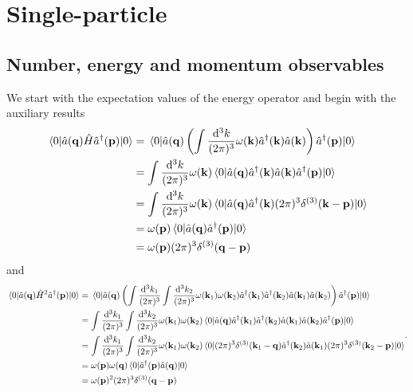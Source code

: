 \section{Single-particle}

\subsection{Number, energy and momentum observables}

We start with the expectation values of the energy operator and begin with the auxiliary results
\begin{equation}
	\begin{split}
		\expval{\hat{a}(\vb{q})\hat{H}\hat{a}^\dagger(\vb{p})}{0}
		&=
		\expval{
			\hat{a}(\vb{q})
			\left(
				\int\frac{\dd[3]{k}}{(2\pi)^3}
				\omega(\vb{k})
				\hat{a}^\dagger(\vb{k})
				\hat{a}(\vb{k})
			\right)
			\hat{a}^\dagger(\vb{p})
		}{0}
		\\
		&=
		\int\frac{\dd[3]{k}}{(2\pi)^3}
		\omega(\vb{k})
		\expval{
			\hat{a}(\vb{q})
			\hat{a}^\dagger(\vb{k})
			\hat{a}(\vb{k})
			\hat{a}^\dagger(\vb{p})
		}{0}
		\\
		&=
		\int\frac{\dd[3]{k}}{(2\pi)^3}
		\omega(\vb{k})
		\expval{
			\hat{a}(\vb{q})
			\hat{a}^\dagger(\vb{k})
			(2\pi)^3\delta^{(3)}(\vb{k}-\vb{p})
		}{0}
		\\
		&=
		\omega(\vb{p})
		\expval{
			\hat{a}(\vb{q})
			\hat{a}^\dagger(\vb{p})
		}{0}
		\\
		&=
		\omega(\vb{p})
		(2\pi)^3\delta^{(3)}(\vb{q}-\vb{p})
	\end{split}
\end{equation}
and
\begin{equation}
	\begin{split}
		\expval{
			\hat{a}(\vb{q})
			\hat{H}^2\hat{a}^\dagger(\vb{p})
		}{0}
		&=
		\expval{
			\hat{a}(\vb{q})
			\left(
				\int\frac{\dd[3]{k_1}}{(2\pi)^3}
				\int\frac{\dd[3]{k_2}}{(2\pi)^3}
				\omega(\vb{k}_1)
				\omega(\vb{k}_2)
				\hat{a}^\dagger(\vb{k}_1)
				\hat{a}^\dagger(\vb{k}_2)
				\hat{a}(\vb{k}_1)
				\hat{a}(\vb{k}_2)
			\right)
			\hat{a}^\dagger(\vb{p})
		}{0}
		\\
		&=
		\int\frac{\dd[3]{k_1}}{(2\pi)^3}
		\int\frac{\dd[3]{k_2}}{(2\pi)^3}
		\omega(\vb{k}_1)
		\omega(\vb{k}_2)
		\expval{
			\hat{a}(\vb{q})
			\hat{a}^\dagger(\vb{k}_1)
			\hat{a}^\dagger(\vb{k}_2)
			\hat{a}(\vb{k}_1)
			\hat{a}(\vb{k}_2)
			\hat{a}^\dagger(\vb{p})
		}{0}
		\\
		&=
		\int\frac{\dd[3]{k_1}}{(2\pi)^3}
		\int\frac{\dd[3]{k_2}}{(2\pi)^3}
		\omega(\vb{k}_1)
		\omega(\vb{k}_2)
		\expval{
			(2\pi)^3
			\delta^{(3)}(\vb{k}_1-\vb{q})
			\hat{a}^\dagger(\vb{k}_2)
			\hat{a}(\vb{k}_1)
			(2\pi)^3
			\delta^{(3)}(\vb{k}_2-\vb{p})
		}{0}
		\\
		&=
		\omega(\vb{p})
		\omega(\vb{q})
		\expval{
			\hat{a}^\dagger(\vb{p})
			\hat{a}(\vb{q})
		}{0}
		\\
		&=
		\omega(\vb{p})^2
		(2\pi)^3
		\delta^{(3)}(\vb{q}-\vb{p})
	\end{split}
	.
\end{equation}
